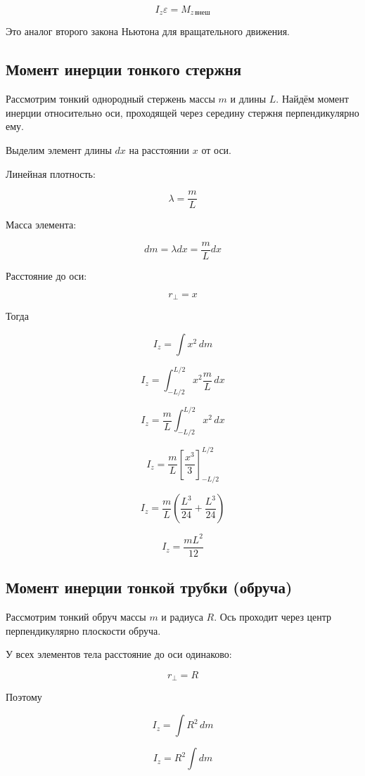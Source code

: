 \documentclass[a4paper,12pt]{article}
\begin{document}
\[
I_z \varepsilon = M_{z\,\text{внеш}}
\]

Это аналог второго закона Ньютона для вращательного движения.

\vspace{0.8em}

\subsection*{Момент инерции тонкого стержня}

Рассмотрим тонкий однородный стержень массы $m$ и длины $L$.
Найдём момент инерции относительно оси, проходящей через середину стержня перпендикулярно ему.

Выделим элемент длины $dx$ на расстоянии $x$ от оси.

Линейная плотность:

\[
\lambda = \frac{m}{L}
\]

Масса элемента:

\[
dm = \lambda dx = \frac{m}{L} dx
\]

Расстояние до оси:

\[
r_{\perp} = x
\]

Тогда

\[
I_z = \int x^2 \, dm
\]

\[
I_z = \int_{-L/2}^{L/2} x^2 \frac{m}{L} \, dx
\]

\[
I_z = \frac{m}{L} \int_{-L/2}^{L/2} x^2 \, dx
\]

\[
I_z = \frac{m}{L} \left[ \frac{x^3}{3} \right]_{-L/2}^{L/2}
\]

\[
I_z = \frac{m}{L} \left( \frac{L^3}{24} + \frac{L^3}{24} \right)
\]

\[
I_z = \frac{mL^2}{12}
\]

\vspace{0.8em}

\subsection*{Момент инерции тонкой трубки (обруча)}

Рассмотрим тонкий обруч массы $m$ и радиуса $R$.
Ось проходит через центр перпендикулярно плоскости обруча.

У всех элементов тела расстояние до оси одинаково:

\[
r_{\perp} = R
\]

Поэтому

\[
I_z = \int R^2 \, dm
\]

\[
I_z = R^2 \int dm
\]
\end{document}
